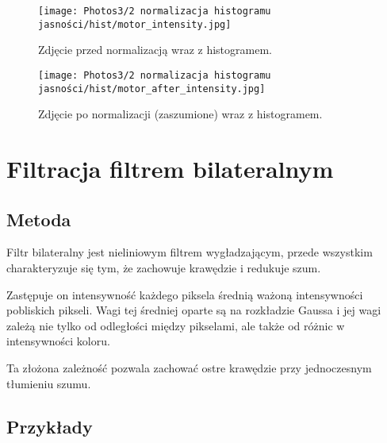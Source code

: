 \documentclass[]{mwart}
\begin{document}
\begin{figure}[H]
    \centering
    \texttt{[image: Photos3/2 normalizacja histogramu jasności/hist/motor\_intensity.jpg]}
    \caption{Zdjęcie przed normalizacją wraz z histogramem.}
\end{figure}
\begin{figure}[H]
    \centering
    \texttt{[image: Photos3/2 normalizacja histogramu jasności/hist/motor\_after\_intensity.jpg]}
    \caption{Zdjęcie po normalizacji (zaszumione) wraz z histogramem.}
\end{figure}





\section{Filtracja filtrem bilateralnym         }
\subsection{Metoda}
Filtr bilateralny jest nieliniowym filtrem wygładzającym, przede wszystkim charakteryzuje się tym,
że zachowuje krawędzie i redukuje szum.

Zastępuje on intensywność każdego
piksela średnią ważoną intensywności pobliskich pikseli.
Wagi tej średniej oparte są na rozkładzie Gaussa i jej wagi zależą nie tylko od odległości
między pikselami, ale także od różnic w intensywności koloru.

Ta złożona zależność pozwala zachować ostre krawędzie przy jednoczesnym tłumieniu szumu.

\subsection{Przykłady}
\end{document}
